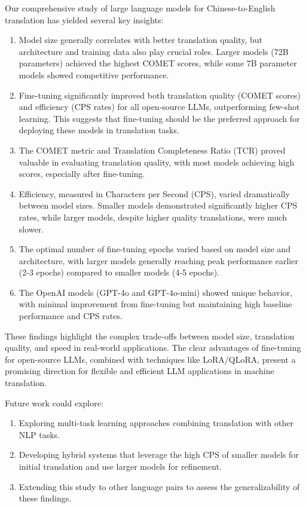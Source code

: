 \documentclass[conference]{IEEEtran}
\begin{document}
Our comprehensive study of large language models for Chinese-to-English translation has yielded several key insights:

\begin{enumerate}
    \item Model size generally correlates with better translation quality, but architecture and training data also play crucial roles. Larger models (72B parameters) achieved the highest COMET scores, while some 7B parameter models showed competitive performance.

    \item Fine-tuning significantly improved both translation quality (COMET scores) and efficiency (CPS rates) for all open-source LLMs, outperforming few-shot learning. This suggests that fine-tuning should be the preferred approach for deploying these models in translation tasks.

    \item The COMET metric and Translation Completeness Ratio (TCR) proved valuable in evaluating translation quality, with most models achieving high scores, especially after fine-tuning.

    \item Efficiency, measured in Characters per Second (CPS), varied dramatically between model sizes. Smaller models demonstrated significantly higher CPS rates, while larger models, despite higher quality translations, were much slower.

    \item The optimal number of fine-tuning epochs varied based on model size and architecture, with larger models generally reaching peak performance earlier (2-3 epochs) compared to smaller models (4-5 epochs).

    \item The OpenAI models (GPT-4o and GPT-4o-mini) showed unique behavior, with minimal improvement from fine-tuning but maintaining high baseline performance and CPS rates.
\end{enumerate}

These findings highlight the complex trade-offs between model size, translation quality, and speed in real-world applications. The clear advantages of fine-tuning for open-source LLMs, combined with techniques like LoRA/QLoRA, present a promising direction for flexible and efficient LLM applications in machine translation.

Future work could explore:

\begin{enumerate}
    \item Exploring multi-task learning approaches combining translation with other NLP tasks.
        
    \item Developing hybrid systems that leverage the high CPS of smaller models for initial translation and use larger models for refinement.
    
    \item Extending this study to other language pairs to assess the generalizability of these findings.
\end{enumerate}
\end{document}
